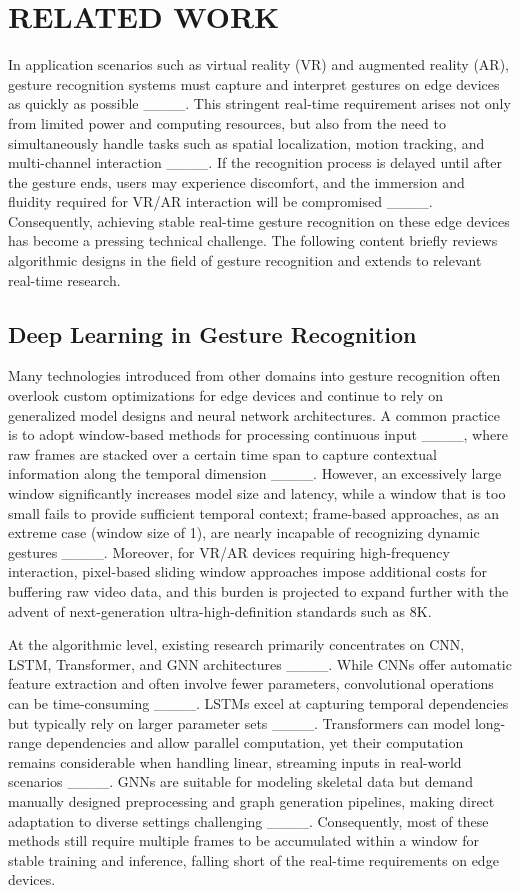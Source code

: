 \section{RELATED WORK}
In application scenarios such as virtual reality (VR) and augmented reality (AR), gesture recognition systems must capture and interpret gestures on edge devices as quickly as possible ____. This stringent real-time requirement arises not only from limited power and computing resources, but also from the need to simultaneously handle tasks such as spatial localization, motion tracking, and multi-channel interaction ____. If the recognition process is delayed until after the gesture ends, users may experience discomfort, and the immersion and fluidity required for VR/AR interaction will be compromised ____. Consequently, achieving stable real-time gesture recognition on these edge devices has become a pressing technical challenge. The following content briefly reviews algorithmic designs in the field of gesture recognition and extends to relevant real-time research.

\subsection{Deep Learning in Gesture Recognition}
Many technologies introduced from other domains into gesture recognition often overlook custom optimizations for edge devices and continue to rely on generalized model designs and neural network architectures. A common practice is to adopt window-based methods for processing continuous input ____, where raw frames are stacked over a certain time span to capture contextual information along the temporal dimension ____. However, an excessively large window significantly increases model size and latency, while a window that is too small fails to provide sufficient temporal context; frame-based approaches, as an extreme case (window size of 1), are nearly incapable of recognizing dynamic gestures ____. Moreover, for VR/AR devices requiring high-frequency interaction, pixel-based sliding window approaches impose additional costs for buffering raw video data, and this burden is projected to expand further with the advent of next-generation ultra-high-definition standards such as 8K.

At the algorithmic level, existing research primarily concentrates on CNN, LSTM, Transformer, and GNN architectures ____. While CNNs offer automatic feature extraction and often involve fewer parameters, convolutional operations can be time-consuming ____. LSTMs excel at capturing temporal dependencies but typically rely on larger parameter sets ____. Transformers can model long-range dependencies and allow parallel computation, yet their computation remains considerable when handling linear, streaming inputs in real-world scenarios ____. GNNs are suitable for modeling skeletal data but demand manually designed preprocessing and graph generation pipelines, making direct adaptation to diverse settings challenging ____. Consequently, most of these methods still require multiple frames to be accumulated within a window for stable training and inference, falling short of the real-time requirements on edge devices.

